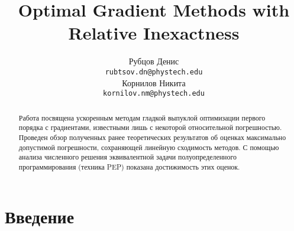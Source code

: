 \documentclass{article}
\title{Optimal Gradient Methods with Relative Inexactness}
\author{
	Рубцов Денис \\
	\texttt{rubtsov.dn@phystech.edu} \\
	\And
	Корнилов Никита \\
	\texttt{kornilov.nm@phystech.edu} \\
}
\date{}
\begin{document}
\maketitle

\begin{abstract}
Работа посвящена ускоренным методам гладкой выпуклой оптимизации первого порядка с градиентами, известными лишь с некоторой относительной погрешностью. Проведен обзор полученных ранее теоретических результатов об оценках максимально допустимой погрешности, сохраняющей линейную сходимость методов. С помощью анализа численного решения эквивалентной задачи полуопределенного программирования (техника PEP) показана достижимость этих оценок.

\end{abstract}



\section{Введение}


%
\end{document}
